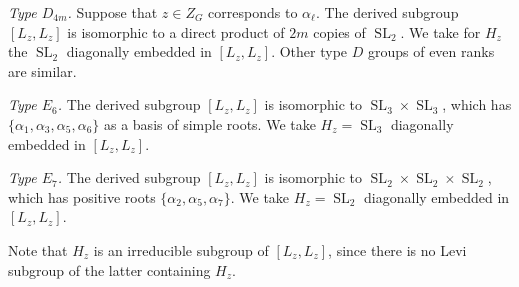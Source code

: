 \documentclass[11pt,oneside,dvipsnames]{amsart}
\theoremstyle{plain}
\theoremstyle{definition}
\theoremstyle{named}
\DeclareMathOperator{\SL}{SL}
\begin{document}
\textit{Type $D_{4m}$.} Suppose that $z\in Z_G$ corresponds to $\alpha_{\ell}$. The derived subgroup $[L_z,L_z]$ is isomorphic to a direct product of $2m$ copies of $\SL_2$. We take for $H_z$ the $\SL_2$ diagonally embedded in $[L_z,L_z]$. Other type $D$ groups of even ranks are similar.

\textit{Type $E_6$.} The derived subgroup $[L_z,L_z]$ is isomorphic to $\SL_3\times\SL_3$, which has $\{\alpha_1,\alpha_3,\alpha_5,\alpha_6\}$ as a basis of simple roots. We take $H_z=\SL_3$ diagonally embedded in $[L_z,L_z]$.

\textit{Type $E_7$.} The derived subgroup $[L_z,L_z]$ is isomorphic to $\SL_2\times\SL_2\times\SL_2$, which has positive roots $\{\alpha_2,\alpha_5,\alpha_7\}$. We take $H_z=\SL_2$ diagonally embedded in $[L_z,L_z]$.

Note that $H_z$ is an irreducible subgroup of $[L_z,L_z]$, since there is no Levi subgroup of the latter containing $H_z$. 
\end{document}
